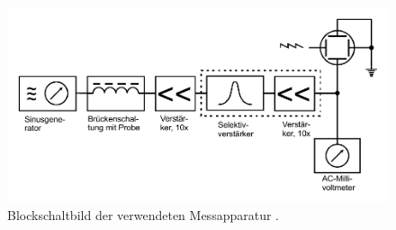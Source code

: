\begin{figure}
    \centering
    \includegraphics[width=\linewidth]{pictures/Zeichnung4.pdf}
    \caption{Blockschaltbild der verwendeten Messapparatur \cite{v606}.}
    \label{fig:Zeichnung4}
\end{figure}